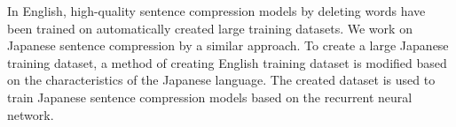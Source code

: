 In English, high-quality sentence compression models by deleting words have been trained on automatically created large training datasets. We work on Japanese sentence compression by a similar approach. To create a large Japanese training dataset, a method of creating English training dataset is modified based on the characteristics of the Japanese language. The created dataset is used to train Japanese sentence compression models based on the recurrent neural network.
